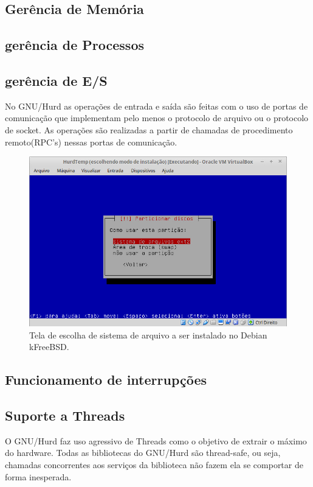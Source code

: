 \documentclass[conference]{IEEEtran}
\begin{document}
\subsection{Gerência de Memória}\label{sec:HurdMem}

\subsection{gerência de Processos}\label{sec:HURDPROC}

\subsection{gerência de E/S}\label{sec:HurdES}
No GNU/Hurd as operações de entrada e saída são feitas com o uso de portas de comunicação que implementam pelo menos o protocolo de arquivo ou o protocolo de socket. As operações são realizadas a partir de chamadas de procedimento remoto(RPC's) nessas portas de comunicação\cite{HurdIO}.

\begin{figure}[h!]
	\centering
	\includegraphics[scale=0.35]{SistemasArquivosHurd.jpeg}
	\caption{Tela de escolha de sistema de arquivo a ser instalado no Debian kFreeBSD.}
	\label{fig:SisAqrLinux}
\end{figure}

\subsection{Funcionamento de interrupções}\label{sec:HurdInt}

\subsection{Suporte a Threads}\label{sec:HurdThreads}
O GNU/Hurd faz uso agressivo de Threads como o objetivo de extrair o máximo do hardware.\cite{Hurd} Todas as bibliotecas do GNU/Hurd são thread-safe, ou seja, chamadas concorrentes aos serviços da biblioteca não fazem ela se comportar de forma inesperada.
\end{document}
